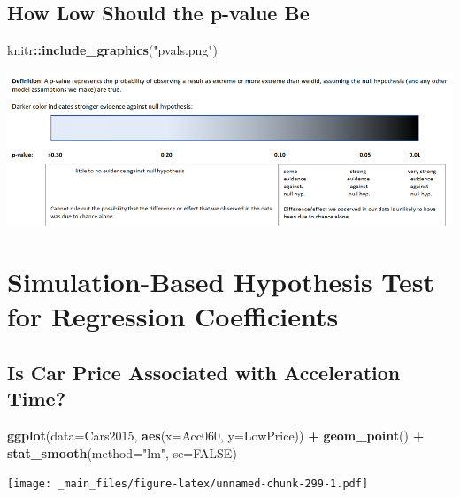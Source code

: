 \documentclass[]{book}
\newenvironment{Shaded}{\begin{snugshade}}{\end{snugshade}}
\newcommand{\KeywordTok}[1]{\textcolor[rgb]{0.13,0.29,0.53}{\textbf{#1}}}
\newcommand{\DataTypeTok}[1]{\textcolor[rgb]{0.13,0.29,0.53}{#1}}
\newcommand{\StringTok}[1]{\textcolor[rgb]{0.31,0.60,0.02}{#1}}
\newcommand{\OtherTok}[1]{\textcolor[rgb]{0.56,0.35,0.01}{#1}}
\newcommand{\OperatorTok}[1]{\textcolor[rgb]{0.81,0.36,0.00}{\textbf{#1}}}
\newcommand{\NormalTok}[1]{#1}
\begin{document}
\subsection{How Low Should the p-value
Be}\label{how-low-should-the-p-value-be}

\begin{Shaded}
\begin{Highlighting}[]
\NormalTok{knitr}\OperatorTok{::}\KeywordTok{include_graphics}\NormalTok{(}\StringTok{"pvals.png"}\NormalTok{)}
\end{Highlighting}
\end{Shaded}

\includegraphics[width=1\linewidth]{pvals}

\section{Simulation-Based Hypothesis Test for Regression
Coefficients}\label{simulation-based-hypothesis-test-for-regression-coefficients}

\subsection{Is Car Price Associated with Acceleration
Time?}\label{is-car-price-associated-with-acceleration-time}

\begin{Shaded}
\begin{Highlighting}[]
\KeywordTok{ggplot}\NormalTok{(}\DataTypeTok{data=}\NormalTok{Cars2015, }\KeywordTok{aes}\NormalTok{(}\DataTypeTok{x=}\NormalTok{Acc060, }\DataTypeTok{y=}\NormalTok{LowPrice)) }\OperatorTok{+}\StringTok{ }\KeywordTok{geom_point}\NormalTok{() }\OperatorTok{+}\StringTok{ }
\StringTok{  }\KeywordTok{stat_smooth}\NormalTok{(}\DataTypeTok{method=}\StringTok{"lm"}\NormalTok{, }\DataTypeTok{se=}\OtherTok{FALSE}\NormalTok{)}
\end{Highlighting}
\end{Shaded}

\texttt{[image: \_main\_files/figure-latex/unnamed-chunk-299-1.pdf]}
\end{document}
